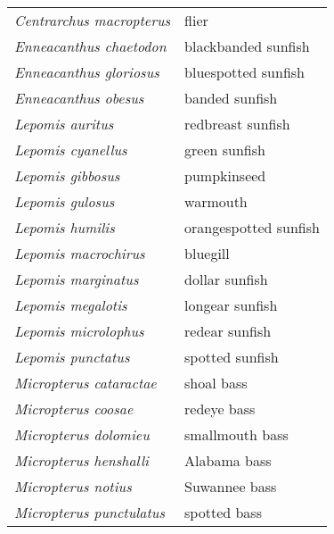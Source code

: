 \documentclass[11pt]{article}
\begin{document}
\newpage

\vspace{\baselineskip}

%
\textbf{\Student}

\begin{tabular}{@{}L{3in}L{3in}@{}}
\textit{Centrarchus macropterus} &   flier\tabularnewline
\textit{Enneacanthus chaetodon} &   blackbanded sunfish\tabularnewline
\textit{Enneacanthus gloriosus} &   bluespotted sunfish\tabularnewline
\textit{Enneacanthus obesus} &   banded sunfish\tabularnewline
\textit{Lepomis auritus} &   redbreast sunfish\tabularnewline
\textit{Lepomis cyanellus} &   green sunfish\tabularnewline
\textit{Lepomis gibbosus} &   pumpkinseed\tabularnewline
\textit{Lepomis gulosus} &   warmouth\tabularnewline
\textit{Lepomis humilis} &   orangespotted sunfish\tabularnewline
\textit{Lepomis macrochirus} &   bluegill\tabularnewline
\textit{Lepomis marginatus} &   dollar sunfish\tabularnewline
\textit{Lepomis megalotis} &   longear sunfish\tabularnewline
\textit{Lepomis microlophus} &   redear sunfish\tabularnewline
\textit{Lepomis punctatus} &   spotted sunfish\tabularnewline
\textit{Micropterus cataractae} &   shoal bass\tabularnewline
\textit{Micropterus coosae} &   redeye bass\tabularnewline
\textit{Micropterus dolomieu} &   smallmouth bass\tabularnewline
\textit{Micropterus henshalli} &   Alabama bass\tabularnewline
\textit{Micropterus notius} &   Suwannee bass\tabularnewline
\textit{Micropterus punctulatus} &   spotted bass\tabularnewline
\end{tabular}

\vspace{\baselineskip}

%
\textbf{\Student}
\end{document}
